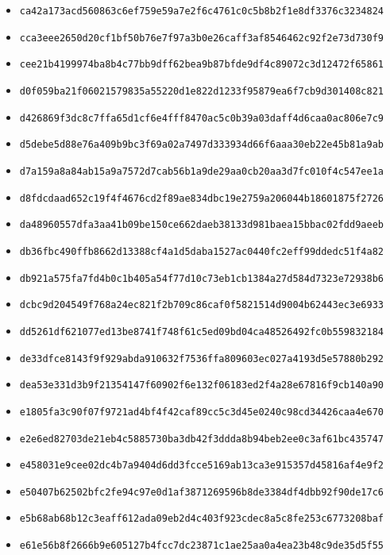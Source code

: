 {\begin{itemize}
    \item \texttt{ca42a173acd560863c6ef759e59a7e2f6c4761c0c5b8b2f1e8df3376c3234824}
    \item \texttt{cca3eee2650d20cf1bf50b76e7f97a3b0e26caff3af8546462c92f2e73d730f9}
    \item \texttt{cee21b4199974ba8b4c77bb9dff62bea9b87bfde9df4c89072c3d12472f65861}
    \item \texttt{d0f059ba21f06021579835a55220d1e822d1233f95879ea6f7cb9d301408c821}
    \item \texttt{d426869f3dc8c7ffa65d1cf6e4fff8470ac5c0b39a03daff4d6caa0ac806e7c9}
    \item \texttt{d5debe5d88e76a409b9bc3f69a02a7497d333934d66f6aaa30eb22e45b81a9ab}
    \item \texttt{d7a159a8a84ab15a9a7572d7cab56b1a9de29aa0cb20aa3d7fc010f4c547ee1a}
    \item \texttt{d8fdcdaad652c19f4f4676cd2f89ae834dbc19e2759a206044b18601875f2726}
    \item \texttt{da48960557dfa3aa41b09be150ce662daeb38133d981baea15bbac02fdd9aeeb}
    \item \texttt{db36fbc490ffb8662d13388cf4a1d5daba1527ac0440fc2eff99ddedc51f4a82}
    \item \texttt{db921a575fa7fd4b0c1b405a54f77d10c73eb1cb1384a27d584d7323e72938b6}
    \item \texttt{dcbc9d204549f768a24ec821f2b709c86caf0f5821514d9004b62443ec3e6933}
    \item \texttt{dd5261df621077ed13be8741f748f61c5ed09bd04ca48526492fc0b559832184}
    \item \texttt{de33dfce8143f9f929abda910632f7536ffa809603ec027a4193d5e57880b292}
    \item \texttt{dea53e331d3b9f21354147f60902f6e132f06183ed2f4a28e67816f9cb140a90}
    \item \texttt{e1805fa3c90f07f9721ad4bf4f42caf89cc5c3d45e0240c98cd34426caa4e670}
    \item \texttt{e2e6ed82703de21eb4c5885730ba3db42f3ddda8b94beb2ee0c3af61bc435747}
    \item \texttt{e458031e9cee02dc4b7a9404d6dd3fcce5169ab13ca3e915357d45816af4e9f2}
    \item \texttt{e50407b62502bfc2fe94c97e0d1af3871269596b8de3384df4dbb92f90de17c6}
    \item \texttt{e5b68ab68b12c3eaff612ada09eb2d4c403f923cdec8a5c8fe253c6773208baf}
    \item \texttt{e61e56b8f2666b9e605127b4fcc7dc23871c1ae25aa0a4ea23b48c9de35d5f55}

\end{itemize}}
